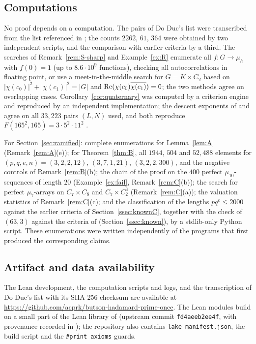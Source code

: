 \subsection{Computations}\label{ssec:comp}
No proof depends on a computation. The pairs of Do Duc's list were
transcribed from the list referenced in \cite[Remark~3.13]{DoDuc2019};
the counts $2262$, $61$, $364$ were obtained by two independent scripts,
and the comparison with earlier criteria by a third. The searches of
Remark~\ref{rem:S-sharp} and Example~\ref{ex:R} enumerate all
$f:G\to\mu_h$ with $f(0)=1$ (up to $8.6\cdot10^9$ functions), checking
all autocorrelations in floating point, or use a meet-in-the-middle
search for $G=K\times C_2$ based on $|\chi(c_0)|^2+|\chi(c_1)|^2=|G|$
and $\operatorname{Re}(\chi(c_0)\overline{\chi(c_1)})=0$; the two methods
agree on overlapping cases. Corollary~\ref{cor:quaternary} was computed
by a criterion engine and reproduced by an independent implementation;
the descent exponents of \cite[Def.~2.6]{LeungSchmidt2005} and
\cite[Def.~2.10]{LeungSchmidt2012} agree on all $33{,}223$ pairs $(L,N)$
used, and both reproduce $F(165^2,165)=3\cdot5^2\cdot11^2$
\cite[Example~2.7]{LeungSchmidt2005}.

For Section~\ref{sec:ramified}: complete enumerations for Lemma~\ref{lem:A}
(Remark~\ref{rem:A}(e)); for Theorem~\ref{thm:B}, all $1944$, $504$ and
$52{,}488$ elements for $(p,q,e,n)=(3,2,2,12)$, $(3,7,1,21)$,
$(3,2,2,300)$, and the negative controls of Remark~\ref{rem:B}(b); the
chain of the proof on the $400$ perfect $\mu_{10}$-sequences of length
$20$ (Example~\ref{ex:fail}, Remark~\ref{rem:C}(b)); the search for
perfect $\mu_7$-arrays on $C_7\times C_8$ and $C_7\times C_2^3$
(Remark~\ref{rem:C}(a)); the valuation statistics of
Remark~\ref{rem:C}(c); and the classification of the lengths
$pq^e\le2000$ against the earlier criteria of Section~\ref{ssec:knownC},
together with the check of $(63,3)$ against the criteria of
\cite{DoDuc2019} (Section~\ref{ssec:known}), by a stdlib-only Python
script. These enumerations were written independently of the programs
that first produced the corresponding claims.

\subsection{Artifact and data availability}\label{ssec:artifact}
The Lean development, the computation scripts and logs, and the
transcription of Do Duc's list with its SHA-256 checksum are available at
\url{https://github.com/acprk/butson-hadamard-prime-once}. The Lean
modules build on a small part of the Lean library of \cite{OpenAI2026}
(upstream commit \texttt{fd4aeeb2ee4f}, with provenance recorded in
); the repository also contains
\texttt{lake-manifest.json}, the build script and the
\texttt{\#print axioms} guards.
